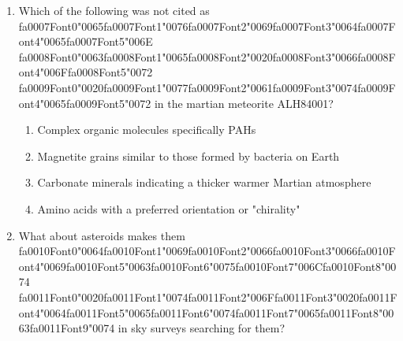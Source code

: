 \documentclass[12pt]{article}
\begin{document}
\begin{enumerate}[label=\arabic*.]
\begin{enumerate}[label=(\alph*)]
    \item dark lavas inside volcanic calderas
    \item dark lavas filling older impact basins
    \item the bright regions on the Moon
\end{enumerate}
\item Which of the following was not cited as {\csname fa0007Font0\endcsname\char"0065}{\csname fa0007Font1\endcsname\char"0076}{\csname fa0007Font2\endcsname\char"0069}{\csname fa0007Font3\endcsname\char"0064}{\csname fa0007Font4\endcsname\char"0065}{\csname fa0007Font5\endcsname\char"006E} {\csname fa0008Font0\endcsname\char"0063}{\csname fa0008Font1\endcsname\char"0065}{\csname fa0008Font2\endcsname\char"0020}{\csname fa0008Font3\endcsname\char"0066}{\csname fa0008Font4\endcsname\char"006F}{\csname fa0008Font5\endcsname\char"0072} {\csname fa0009Font0\endcsname\char"0020}{\csname fa0009Font1\endcsname\char"0077}{\csname fa0009Font2\endcsname\char"0061}{\csname fa0009Font3\endcsname\char"0074}{\csname fa0009Font4\endcsname\char"0065}{\csname fa0009Font5\endcsname\char"0072} in the martian meteorite
ALH84001?
\begin{enumerate}[label=(\alph*)]
    \item Complex organic molecules specifically PAHs
    \item Magnetite grains similar to those formed by bacteria on Earth
    \item Carbonate minerals indicating a thicker warmer Martian atmosphere
    \item Amino acids with a preferred orientation or "chirality"
\end{enumerate}
\item What about asteroids makes them {\csname fa0010Font0\endcsname\char"0064}{\csname fa0010Font1\endcsname\char"0069}{\csname fa0010Font2\endcsname\char"0066}{\csname fa0010Font3\endcsname\char"0066}{\csname fa0010Font4\endcsname\char"0069}{\csname fa0010Font5\endcsname\char"0063}{\csname fa0010Font6\endcsname\char"0075}{\csname fa0010Font7\endcsname\char"006C}{\csname fa0010Font8\endcsname\char"0074} {\csname fa0011Font0\endcsname\char"0020}{\csname fa0011Font1\endcsname\char"0074}{\csname fa0011Font2\endcsname\char"006F}{\csname fa0011Font3\endcsname\char"0020}{\csname fa0011Font4\endcsname\char"0064}{\csname fa0011Font5\endcsname\char"0065}{\csname fa0011Font6\endcsname\char"0074}{\csname fa0011Font7\endcsname\char"0065}{\csname fa0011Font8\endcsname\char"0063}{\csname fa0011Font9\endcsname\char"0074} in sky surveys searching for them?

\end{enumerate}
\end{document}
